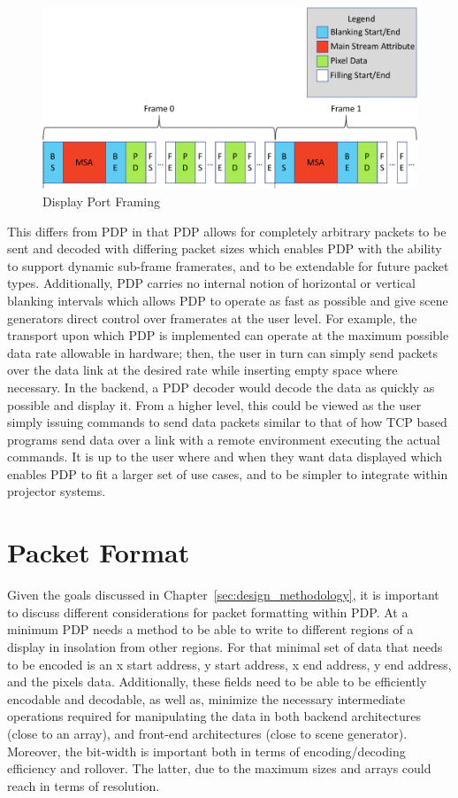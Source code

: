     \begin{figure}
        \centering
        \includegraphics[width=1.0\textwidth]{fig/display_port_framing.pdf}
        \caption{Display Port Framing}
        \label{fig:display_port_framing}
    \end{figure}

    This differs from PDP in that PDP allows for completely arbitrary packets to be sent and decoded with differing packet sizes which enables PDP with the ability to support dynamic sub-frame framerates, and to be extendable for future packet types. Additionally, PDP carries no internal notion of horizontal or vertical blanking intervals which allows PDP to operate as fast as possible and give scene generators direct control over framerates at the user level. For example, the transport upon which PDP is implemented can operate at the maximum possible data rate allowable in hardware; then, the user in turn can simply send packets over the data link at the desired rate while inserting empty space where necessary. In the backend, a PDP decoder would decode the data as quickly as possible and display it. From a higher level, this could be viewed as the user simply issuing commands to send data packets similar to that of how TCP based programs send data over a link with a remote environment executing the actual commands. It is up to the user where and when they want data displayed which enables PDP to fit a larger set of use cases, and to be simpler to integrate within projector systems.

\section{Packet Format}
    \label{sec:packet_format}
    Given the goals discussed in Chapter~\ref{sec:design_methodology}, it is important to discuss different considerations for packet formatting within PDP. At a minimum PDP needs a method to be able to write to different regions of a display in insolation from other regions. For that minimal set of data that needs to be encoded is an x start address, y start address, x end address, y end address, and the pixels data. Additionally, these fields need to be able to be efficiently encodable and decodable, as well as, minimize the necessary intermediate operations required for manipulating the data in both backend architectures (close to an array), and front-end architectures (close to scene generator). Moreover, the bit-width is important both in terms of encoding/decoding efficiency and rollover. The latter, due to the maximum sizes and arrays could reach in terms of resolution.


